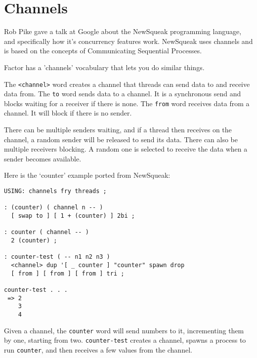 \chapter{Channels}\label{channels}

Rob Pike gave a talk at Google about the NewSqueak programming
language, and specifically how it's concurrency features
work. NewSqueak uses channels and is based on the concepts of
Communicating Sequential Processes.

Factor has a 'channels' vocabulary that lets you do similar things.


The \texttt{<channel>} word creates a channel that threads can send data to and
receive data from. The \texttt{to} word sends data to a channel. It is a
synchronous send and blocks waiting for a receiver if there is
none. The \texttt{from} word receives data from a channel. It will block if
there is no sender.

There can be multiple senders waiting, and if a thread then receives
on the channel, a random sender will be released to send its
data. There can also be multiple receivers blocking. A random one is
selected to receive the data when a sender becomes available.

Here is the `counter' example ported from NewSqueak:

\begin{verbatim}
USING: channels fry threads ;

: (counter) ( channel n -- )
  [ swap to ] [ 1 + (counter) ] 2bi ;
    
: counter ( channel -- )
  2 (counter) ;    

: counter-test ( -- n1 n2 n3 )
  <channel> dup '[ _ counter ] "counter" spawn drop
  [ from ] [ from ] [ from ] tri ; 

counter-test . . . 
 => 2
    3
    4
\end{verbatim}

Given a channel, the \texttt{counter} word will send numbers to it,
incrementing them by one, starting from two. \texttt{counter-test} creates a
channel, spawns a process to run \texttt{counter}, and then receives a few
values from the channel.

